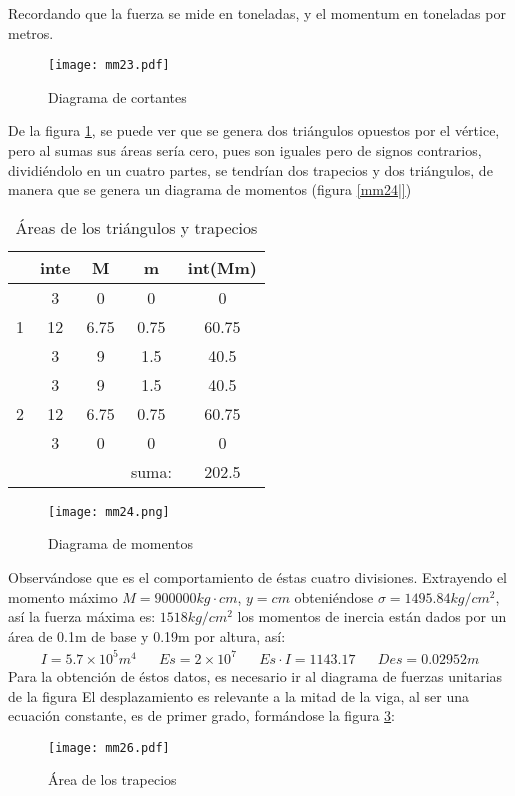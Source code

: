 Recordando que la fuerza se mide en toneladas, y el momentum en toneladas por metros.
\begin{figure}[h!]
\centering
  \texttt{[image: mm23.pdf]}
  \caption{Diagrama de cortantes}
  \label{mm23}
\end{figure}
De la figura \ref{mm23}, se puede ver que se genera dos triángulos opuestos por el vértice, pero al sumas sus áreas sería cero, pues son iguales pero de signos contrarios,
dividiéndolo en un cuatro partes, se tendrían dos trapecios y dos triángulos, de manera que se genera un diagrama de momentos (figura \ref{mm24|})
\begin{table}[h!]
    \centering
    \begin{tabular}{@{}ccccc@{}}
    \toprule
      & inte & M    & m     & int(Mm) \\ \midrule
      & 3    & 0    & 0     & 0       \\
    1 & 12   & 6.75 & 0.75  & 60.75   \\
      & 3    & 9    & 1.5   & 40.5    \\
      & 3    & 9    & 1.5   & 40.5    \\
    2 & 12   & 6.75 & 0.75  & 60.75   \\
      & 3    & 0    & 0     & 0       \\
      &      &      & suma: & 202.5   \\ \bottomrule
    \end{tabular}
    \caption{Áreas de los triángulos y trapecios}
    \label{tabmm8}
    \end{table}
\begin{figure}[h!]
\centering
  \texttt{[image: mm24.png]}
  \caption{Diagrama de momentos}
  \label{mm24}
\end{figure}
Observándose que es el comportamiento de éstas cuatro divisiones. Extrayendo el momento máximo $M=900000kg\cdot cm$, $y=cm$ obteniéndose $\sigma=1495.84kg/cm^2$, así la fuerza máxima es: $1518kg/cm^2$ los momentos de inercia están dados por un área de 0.1m de base y 0.19m por altura, así:
\begin{align*}
    I = 5.7\times 10^{5}m^4&& Es =2\times 10^7&&Es\cdot I = 1143.17&&Des = 0.02952m
\end{align*}
Para la obtención de éstos datos, es necesario ir al diagrama de fuerzas unitarias de la figura %
El desplazamiento es relevante a la mitad de la viga, al ser una ecuación constante, es de primer grado, formándose la figura \ref{mm26}:
\begin{figure}[h!]
\centering
  \texttt{[image: mm26.pdf]}
  \caption{Área de los trapecios}
  \label{mm26}
\end{figure}

